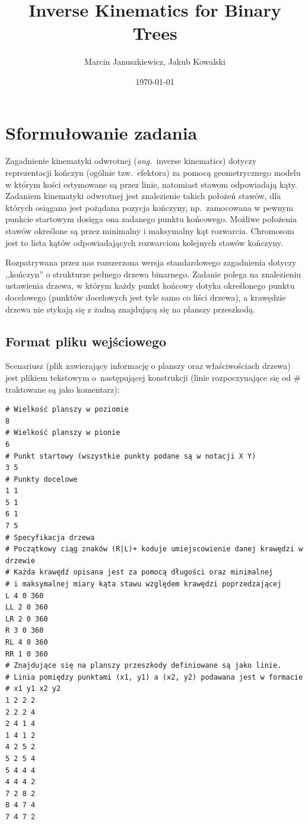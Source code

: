 \documentclass[11pt, leqno]{article}
\title{Inverse Kinematics for Binary Trees}
\date{\today}
\author{Marcin Januszkiewicz, Jakub Kowalski}
\begin{document}
\maketitle
\vspace{17em}
\tableofcontents
\newpage

\section{Sformułowanie zadania}
Zagadnienie kinematyki odwrotnej (\textit{ang.}\ inverse kinematics) dotyczy reprezentacji kończyn (ogólnie tzw.\ efektora) za pomocą geometrycznego modelu w którym kości estymowane są przez linie, natomiast stawom odpowiadają kąty. Zadaniem kinematyki odwrotnej jest znalezienie takich położeń stawów, dla których osiągana jest pożądana pozycja kończyny, np.~zamocowana w pewnym punkcie startowym dosięga ona zadanego punktu końcowego. Możliwe położenia stawów określone są przez minimalny i maksymalny kąt rozwarcia. Chromosom jest to lista kątów odpowiadających rozwarciom kolejnych stawów kończyny.

Rozpatrywana przez nas rozszerzona wersja standardowego zagadnienia dotyczy ,,kończyn'' o strukturze pełnego drzewa binarnego. Zadanie polega na znalezieniu ustawienia drzewa, w którym każdy punkt końcowy dotyka określonego punktu docelowego (punktów docelowych jest tyle samo co liści drzewa), a krawędzie drzewa nie stykają się z żadną znajdującą się na planszy przeszkodą.


\subsection{Format pliku wejściowego}
Scenariusz (plik zawierający informację o planszy oraz właściwościach drzewa) jest plikiem tekstowym o~następującej konstrukcji (linie rozpoczynające się od \# traktowane są jako komentarz):
\begin{verbatim}
# Wielkość planszy w poziomie
8
# Wielkość planszy w pionie
6
# Punkt startowy (wszystkie punkty podane są w notacji X Y)
3 5
# Punkty docelowe
1 1
5 1
6 1
7 5
# Specyfikacja drzewa
# Początkowy ciąg znaków (R|L)+ koduje umiejscowienie danej krawędzi w drzewie
# Każda krawędź opisana jest za pomocą długości oraz minimalnej
# i maksymalnej miary kąta stawu względem krawędzi poprzedzającej
L 4 0 360
LL 2 0 360
LR 2 0 360
R 3 0 360
RL 4 0 360
RR 1 0 360
# Znajdujące się na planszy przeszkody definiowane są jako linie.
# Linia pomiędzy punktami (x1, y1) a (x2, y2) podawana jest w formacie 
# x1 y1 x2 y2
1 2 2 2
2 2 2 4
2 4 1 4
1 4 1 2
4 2 5 2
5 2 5 4
5 4 4 4
4 4 4 2
7 2 8 2
8 4 7 4
7 4 7 2
\end{verbatim}
\end{document}
